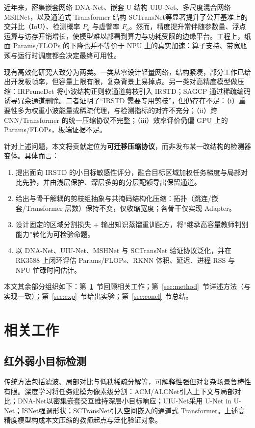 \documentclass[lettersize,journal]{IEEEtran}
\begin{document}
近年来，密集嵌套网络 DNA-Net\cite{DNANet2023}、嵌套 U 结构 UIU-Net\cite{UIUNet2023}、多尺度混合网络 MSHNet，以及通道式 Transformer 结构 SCTransNet\cite{SCTransNet2024}等显著提升了公开基准上的交并比（IoU）、检测概率 $P_d$ 与虚警率 $F_a$。然而，精度提升常伴随参数量、浮点运算与访存开销增长，使模型难以部署到算力与功耗受限的边缘平台。工程上，纸面 Params/FLOPs 的下降也并不等价于 NPU 上的真实加速：算子支持、带宽瓶颈与运行时调度都会决定最终可用性。

现有高效化研究大致分为两类。一类从零设计轻量网络\cite{RDIAN2023,LWIRSTNet2023,RepISDNet2023,L2SKNet2025}，结构紧凑，部分工作已给出开发板帧率，但容量上限有限，复杂背景上易掉点。另一类对高精度模型做压缩：IRPruneDet\cite{IRPruneDet2024} 将小波结构正则软通道剪枝引入 IRSTD；SAGCP\cite{SAGCP2025} 通过稀疏编码诱导冗余通道删除。二者证明了“IRSTD 需要专用剪枝”，但仍存在不足：（i）重要性多为权重小波能量或稀疏代理，与检测指标的对齐不充分；（ii）跨 CNN/Transformer 的统一压缩协议不完整；（iii）效率评价仍偏 GPU 上的 Params/FLOPs，板端证据不足。

针对上述问题，本文将贡献定位为\textbf{可迁移压缩协议}，而非发布某一改结构的检测器变体。具体而言：
\begin{enumerate}
\item 提出面向 IRSTD 的小目标敏感性评分，融合目标区域加权任务梯度与局部对比先验，并由浅层保护、深层多剪的分层配额导出保留通道。
\item 给出与骨干解耦的剪枝组抽象与共掩码结构化压缩：拓扑（跳连/嵌套/Transformer 层数）保持不变，仅收缩宽度；各骨干仅实现 Adapter。
\item 设计固定的区域分割损失 + 输出知识蒸馏重训配方，将“继承高容量教师判别能力”转化为可检验命题。
\item 以 DNA-Net、UIU-Net、MSHNet 与 SCTransNet 验证协议泛化，并在 RK3588 上闭环评估 Params/FLOPs、RKNN 体积、延迟、进程 RSS 与 NPU 忙碌时间估计。
\end{enumerate}

本文其余部分组织如下：第~\ref{sec:related}~节回顾相关工作；第~\ref{sec:method}~节详述方法（与实现一致）；第~\ref{sec:exp}~节给出实验；第~\ref{sec:concl}~节总结。

\section{相关工作}
\label{sec:related}

\subsection{红外弱小目标检测}
传统方法包括滤波、局部对比与低秩稀疏分解等\cite{IPI2013}，可解释性强但对复杂场景鲁棒性有限。深度学习将任务建模为像素级分割：ACM/ALCNet\cite{ACM2021,ALCNet2021}引入上下文与局部对比；DNA-Net\cite{DNANet2023}以密集嵌套交互维持深层小目标响应；UIU-Net\cite{UIUNet2023}采用 U-Net in U-Net；ISNet\cite{ISNet2022}强调形状；SCTransNet\cite{SCTransNet2024}引入空间嵌入的通道式 Transformer。上述高精度模型构成本文压缩的教师起点与泛化验证对象。
\end{document}
